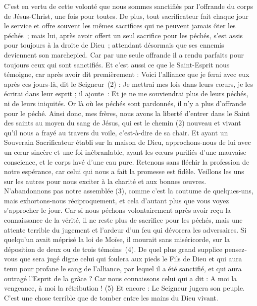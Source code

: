 \begin{multicols}{2}
C’est en vertu de cette volonté que nous sommes sanctifiés par l’offrande du corps de Jésus-Christ, une fois pour toutes.
De plus, tout sacrificateur fait chaque jour le service et offre souvent les mêmes sacrifices qui ne peuvent jamais ôter les péchés ;
mais lui, après avoir offert un seul sacrifice pour les péchés, s’est assis pour toujours à la droite de Dieu ;
attendant désormais que ses ennemis deviennent son marchepied.
Car par une seule offrande il a rendu parfaits pour toujours ceux qui sont sanctifiés.
Et c'est aussi ce que le Saint-Esprit nous témoigne, car après avoir dit premièrement :
Voici l'alliance que je ferai avec eux après ces jours-là, dit le Seigneur (2) : Je mettrai mes lois dans leurs cœurs, je les écrirai dans leur esprit ; il ajoute :
Et je ne me souviendrai plus de leurs péchés, ni de leurs iniquités.
Or là où les péchés sont pardonnés, il n'y a plus d’offrande pour le péché.
Ainsi donc, mes frères, nous avons la liberté d'entrer dans le Saint des saints au moyen du sang de Jésus,
qui est le chemin (2) nouveau et vivant qu'il nous a frayé au travers du voile, c’est-à-dire de sa chair.
Et ayant un Souverain Sacrificateur établi sur la maison de Dieu,
approchons-nous de lui avec un cœur sincère et une foi inébranlable, ayant les cœurs purifiés d’une mauvaise conscience, et le corps lavé d’une eau pure.
Retenons sans fléchir la profession de notre espérance, car celui qui nous a fait la promesse est fidèle.
Veillons les uns sur les autres pour nous exciter à la charité et aux bonnes œuvres.
N’abandonnons pas notre assemblée (3), comme c’est la coutume de quelques-uns, mais exhortons-nous réciproquement, et cela d'autant plus que vous voyez s’approcher le jour.
Car si nous péchons volontairement après avoir reçu la connaissance de la vérité, il ne reste plus de sacrifice pour les péchés,
mais une attente terrible du jugement et l'ardeur d'un feu qui dévorera les adversaires.
Si quelqu'un avait méprisé la loi de Moïse, il mourait sans miséricorde, sur la déposition de deux ou de trois témoins (4).
De quel plus grand supplice pensez-vous que sera jugé digne celui qui foulera aux pieds le Fils de Dieu et qui aura tenu pour profane le sang de l'alliance, par lequel il a été sanctifié, et qui aura outragé l'Esprit de la grâce ?
Car nous connaissons celui qui a dit : A moi la vengeance, à moi la rétribution ! (5) Et encore : Le Seigneur jugera son peuple.
C'est une chose terrible que de tomber entre les mains du Dieu vivant.

\end{multicols}
